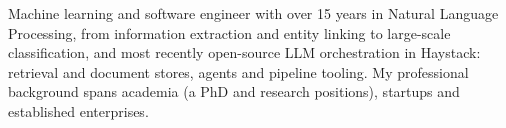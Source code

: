 

\begin{cvparagraph}




Machine learning and software engineer with over 15 years in Natural Language Processing, from information extraction and entity linking to large-scale classification, and most recently open-source LLM orchestration in Haystack: retrieval and document stores, agents and pipeline tooling. My professional background spans academia (a PhD and research positions), startups and established enterprises.

\end{cvparagraph}